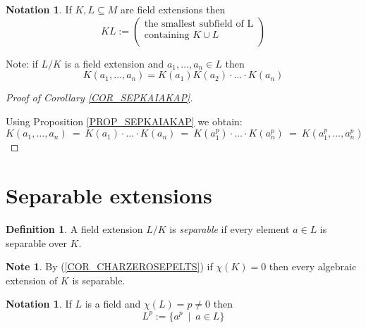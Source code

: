 \documentclass[12pt, letterpaper, oneside]{article}
\theoremstyle{plain}
\theoremstyle{definition}
\newtheorem{definition}[theorem]{Definition}
\newtheorem{notation}[theorem]{Notation}
\newtheorem{note}[theorem]{Note}
\newcommand{\vs}{\vskip 5mm}
\begin{document}
\vs\vs

\begin{notation}
If $K,  L \subseteq M$ are field extensions then 
$$
KL := 
\begin{pmatrix}
\text{the smallest subfield of L} \\[1mm]
\text{containing $K\cup L$} \\
\end{pmatrix}
$$ 
\end{notation}

\vs

Note: if $L/K$ is a field extension and $a_{1}, \dots, a_{n}\in L$ then 
$$K(a_{1}, \dots, a_{n}) = K(a_{1})K(a_{2})\cdot {\dots} \cdot K(a_{n})$$


\vs\vs

\begin{proof}[Proof of Corollary \ref{COR_SEPKAIAKAP}] \ 

Using Proposition \ref{PROP_SEPKAIAKAP} we obtain:
$$K(a_{1}, \dots, a_{n}) \ = \ K(a_{1})\cdot {\dots} \cdot K(a_{n})
\ =\  K(a_{1}^{p})\cdot {\dots} \cdot K(a_{n}^{p})\  =\  K(a_{1}^{p}, \dots, a_{n}^{p})$$
\end{proof}




\newpage
\section{Separable extensions}
\label{SEC_SEPEXT}



\begin{definition}
A field extension $L/K$ is \emph{separable} if every element $a\in L$ is separable 
over $K$.
\end{definition}


\vs\vs

\begin{note}
By (\ref{COR_CHARZEROSEPELTS}) if $\chi(K) = 0$ then every algebraic extension of 
$K$ is separable. 
\end{note}



\vs\vs


\begin{notation}
If $L$ is a field and $\chi(L) = p \neq 0$ then 
$$L^{p} := \{ a^{p} \ \mid \ a\in L  \}$$
\end{notation}
\end{document}

